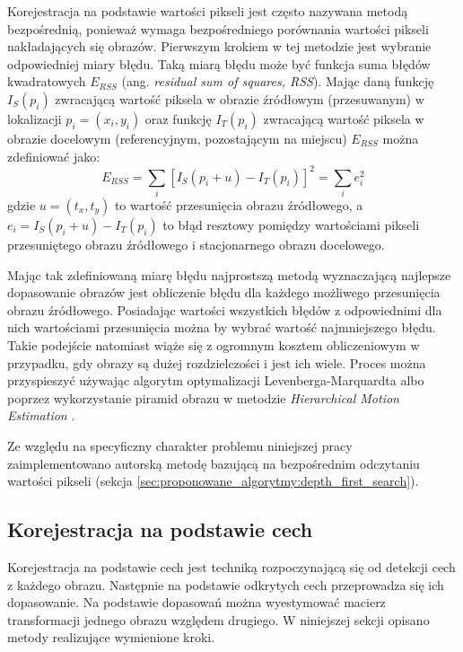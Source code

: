 Korejestracja na podstawie wartości pikseli jest często nazywana metodą bezpośrednią, ponieważ wymaga bezpośredniego porównania wartości pikseli nakładających się obrazów. Pierwszym krokiem w tej metodzie jest wybranie odpowiedniej miary błędu. Taką miarą błędu może być funkcja suma błędów kwadratowych $E_{RSS}$ (ang. \textit{residual sum of squares, RSS}). Mając daną funkcję $I_{S}(p_{i})$ zwracającą wartość piksela w obrazie źródłowym (przesuwanym) w lokalizacji $p_{i}=(x_{i}, y_{i})$ oraz funkcję $I_{T}(p_{i})$ zwracającą wartość piksela w obrazie docelowym (referencyjnym, pozostającym na miejscu) $E_{RSS}$ można zdefiniować jako:
\begin{equation}
E_{RSS}=\sum_{i}[I_{S}(p_{i}+u)-I_{T}(p_{i})]^2=\sum_{i}e_{i}^2
\end{equation}
gdzie $u=(t_{x}, t_{y})$ to wartość przesunięcia obrazu źródłowego, a $e_{i}=I_{S}(p_{i}+u)-I_{T}(p_{i})$ to błąd resztowy pomiędzy wartościami pikseli przesuniętego obrazu źródłowego i stacjonarnego obrazu docelowego.

Mając tak zdefiniowaną miarę błędu najprostszą metodą wyznaczającą najlepsze dopasowanie obrazów jest obliczenie błędu dla każdego możliwego przesunięcia obrazu źródłowego. Posiadając wartości wszystkich błędów z odpowiednimi dla nich wartościami przesunięcia można by wybrać wartość najmniejszego błędu. Takie podejście natomiast wiąże się z ogromnym kosztem obliczeniowym w przypadku, gdy obrazy są dużej rozdzielczości i jest ich wiele. Proces można przyspieszyć używając algorytm optymalizacji Levenberga-Marquardta \cite{unser:07} albo poprzez wykorzystanie piramid obrazu w metodzie \textit{Hierarchical Motion Estimation} \cite{export:70092}.

Ze względu na specyficzny charakter problemu niniejszej pracy zaimplementowano autorską metodę bazującą na bezpośrednim odczytaniu wartości pikseli (sekcja \ref{sec:proponowane_algorytmy:depth_first_search}).

\subsection{Korejestracja na podstawie cech}
\label{sec:algorytmy_korejestracji:korejestracja_na_podstawie_cech}

Korejestracja na podstawie cech jest techniką rozpoczynającą się od detekcji cech z każdego obrazu. Następnie na podstawie odkrytych cech przeprowadza się ich dopasowanie. Na podstawie dopasowań można wyestymować macierz transformacji jednego obrazu względem drugiego. W niniejszej sekcji opisano metody realizujące wymienione kroki.

